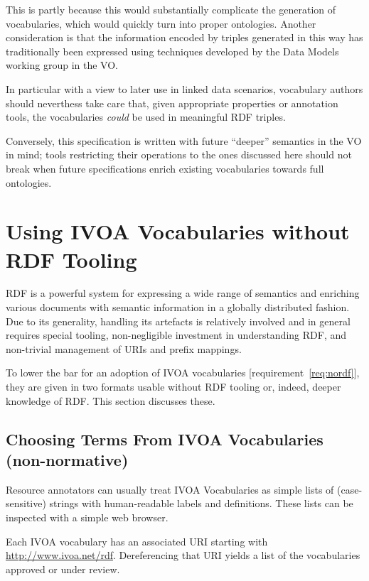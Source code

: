 \documentclass[11pt,a4paper]{ivoa}
\begin{document}
This is partly because this would substantially complicate the
generation of vocabularies, which would quickly turn into proper
ontologies.  Another consideration is that the information encoded by
triples generated in this way has traditionally been expressed 
using techniques developed
by the Data Models working group in the VO.

In particular with a view to later use in linked data scenarios,
vocabulary authors should neverthess take care that, given appropriate
properties or annotation tools, the vocabularies \emph{could} be used in
meaningful RDF triples.

Conversely, this specification is written with future ``deeper''
semantics in the VO in mind; tools restricting their operations to the ones
discussed here should not break when future specifications enrich
existing vocabularies towards full ontologies.


\section{Using IVOA Vocabularies without RDF Tooling}
\label{sect:withoutrdf}

RDF is a
powerful system for expressing a wide range of semantics and enriching
various documents with semantic information in a globally distributed
fashion.  Due to its generality, handling its artefacts is relatively
involved and in general requires special tooling, non-negligible
investment in understanding RDF, and non-trivial management of URIs and
prefix mappings.

To lower the bar for an adoption of IVOA vocabularies
[requirement~\ref{req:nordf}], they are given in
two formats usable without RDF tooling or, indeed, deeper knowledge of
RDF.  This section discusses these.

\subsection{Choosing Terms From IVOA Vocabularies (non-normative)}

Resource annotators can usually treat IVOA Vocabularies as simple lists
of (case-sensitive) strings with human-readable labels and definitions.  
These lists can be inspected with a simple web browser.

Each IVOA vocabulary has an associated URI starting with
\url{http://www.ivoa.net/rdf}.  Dereferencing that URI yields a list of
the vocabularies approved or under review.  
\end{document}
